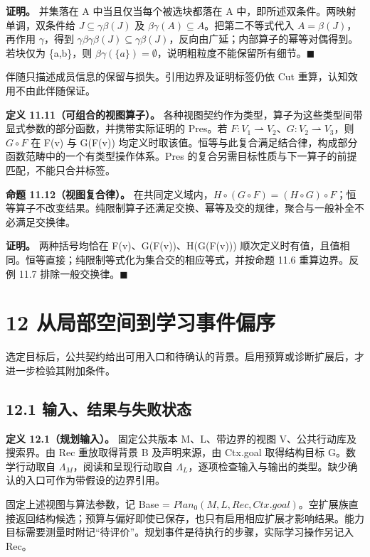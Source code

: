 \documentclass[UTF8,a4paper,zihao=-4,fontset=windows,openany]{ctexbook}
\newcommand{\mcsorigin}[1]{\par\noindent{\small\color{black!55}#1}\par\addvspace{0.8em}}
\def\mathrm#1{#1}%
\begin{document}
\textbf{证明。} 并集落在 A 中当且仅当每个被选块都落在 A 中，即所述双条件。两映射单调，双条件给 \(J\subseteq\gamma\beta(J)\) 及 \(\beta\gamma(A)\subseteq A\)。把第二不等式代入 \(A=\beta(J)\)，再作用 \(\gamma\)，得到 \(\gamma\beta\gamma\beta(J)\subseteq\gamma\beta(J)\)，反向由广延；内部算子的幂等对偶得到。若块仅为 \{a,b\}，则 \(\beta\gamma(\{a\})=\emptyset\)，说明粗粒度不能保留所有细节。\(\blacksquare\)

伴随只描述成员信息的保留与损失。引用边界及证明标签仍依 Cut 重算，认知效用不由此伴随保证。

\textbf{定义 11.11（可组合的视图算子）。} 各种视图契约作为类型，算子为这些类型间带显式参数的部分函数，并携带实际证明的 Pres。若 \(F:V_{1}\rightharpoonup V_{2}\)、\(G:V_{2}\rightharpoonup V_{3}\)，则 \(G\circ F\) 在 F(v) 与 G(F(v)) 均定义时取该值。恒等与此复合满足结合律，构成部分函数范畴中的一个有类型操作体系。Pres 的复合另需目标性质与下一算子的前提匹配，不能只合并标签。

\textbf{命题 11.12（视图复合律）。} 在共同定义域内，\(H\circ(G\circ F)=(H\circ G)\circ F\)；恒等算子不改变结果。纯限制算子还满足交换、幂等及交的规律，聚合与一般补全不必满足交换律。

\textbf{证明。} 两种括号均恰在 F(v)、G(F(v))、H(G(F(v))) 顺次定义时有值，且值相同。恒等直接；纯限制等式化为集合交的相应等式，并按命题 11.6 重算边界。反例 11.7 排除一般交换律。\(\blacksquare\)

\clearpage\chapter{12 从局部空间到学习事件偏序}
\label{mcs-source-14}
\mcsorigin{原章节：12-视图转换与路径规划.md}
选定目标后，公共契约给出可用入口和待确认的背景。启用预算或诊断扩展后，才进一步检验其附加条件。

\section{12.1 输入、结果与失败状态}
\textbf{定义 12.1（规划输入）。} 固定公共版本 M、L、带边界的视图 V、公共行动库及搜索界。由 Rec 重放取得背景 B 及声明来源，由 Ctx.goal 取得结构目标 G。数学行动取自 \(\Lambda_M\)，阅读和呈现行动取自 \(\Lambda_L\)，逐项检查输入与输出的类型。缺少确认的入口可作为带假设的边界引用。

固定上述视图与算法参数，记 Base = \(\mathrm{Plan}_{0}(M,L,\mathrm{Rec},\mathrm{Ctx}.\mathrm{goal})\)。空扩展族直接返回结构候选；预算与偏好即使已保存，也只有启用相应扩展才影响结果。能力目标需要测量时附记“待评价”。规划事件是待执行的步骤，实际学习操作另记入 Rec。
\end{document}
